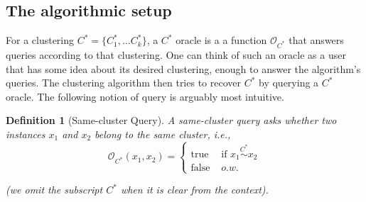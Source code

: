 \documentclass{article}
\newcommand{\mc}{\mathcal}
\newtheorem{definition}[theorem]{Definition}
\begin{document}
 


\subsection{The algorithmic setup}
For a clustering $C^*=\{ C^*_1, \ldots C^*_k\}$, a $C^*$ oracle is a
a function ${\mc O}_{C^*}$ that answers queries according to that clustering. One can think of such an oracle as a user that has some idea about its desired clustering, enough to answer the algorithm's queries. The clustering algorithm then tries to recover $C^*$ by querying a $C^*$ oracle. The following notion of query is arguably most intuitive.

\begin{definition}[Same-cluster Query]
A same-cluster query asks whether two instances $x_1$ and $x_2$ belong to the same cluster, i.e., 
$${\mc O}_{C^*}(x_1, x_2) = \left\{
	\begin{array}{ll}
		\mbox{true }  & \mbox{if } x_1 \overset{C^*}{\sim} x_2   \\
		\mbox{false } & o.w. 
	\end{array}
\right. $$

(we omit the subscript $C^*$ when it is clear from the context).
\end{definition}

\end{document}
